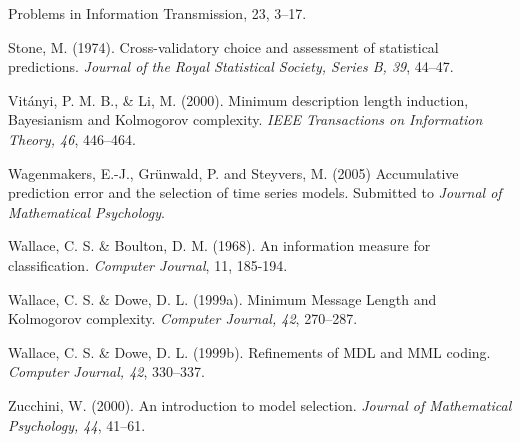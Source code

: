 \documentclass{elsart}
\begin{document}
\begin{list}{}{\setlength{\leftmargin}{12pt}\setlength{\itemindent}{-12pt}\setlength{\parsep}{0pt}}
{  Problems in Information Transmission, 23}, 3--17.
\item Stone, M. (1974). Cross-validatory choice and assessment of statistical predictions.
{\it Journal of the Royal Statistical Society, Series B, 39}, 44--47.
\item Vit\'{a}nyi, P. M. B., \& Li, M. (2000). Minimum description length induction, Bayesianism
and Kolmogorov complexity. {\em IEEE Transactions on Information Theory, 46}, 446--464.
\item Wagenmakers, E.-J., Gr\"{u}nwald, P. and Steyvers, M. (2005) Accumulative prediction error and
the selection of time series models. Submitted to {\it Journal of Mathematical Psychology}.
\item Wallace, C. S. \& Boulton, D. M. (1968). An information measure for classification. {\it Computer Journal},
11, 185-194.
\item Wallace, C. S. \& Dowe, D. L. (1999a). Minimum Message Length and Kolmogorov complexity. {\em Computer
Journal, 42}, 270--287.
\item Wallace, C. S. \& Dowe, D. L. (1999b). Refinements of MDL and MML coding. {\em Computer Journal, 42},
330--337.
\item Zucchini, W. (2000). An introduction to model selection. {\em Journal of Mathematical Psychology, 44},
41--61.
\end{list}
\end{document}
